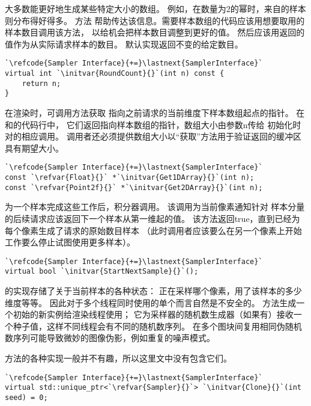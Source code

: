 大多数能更好地生成某些特定大小的数组。
例如，在数量为2的幂时，来自的样本则分布得好得多。
方法
帮助传达该信息。需要样本数组的代码应该用想要取用的样本数目调用该方法，
以给机会把样本数目调整到更好的值。
然后应该用返回的值作为从实际请求样本的数目。
默认实现返回不变的给定数目。
\begin{lstlisting}
`\refcode{Sampler Interface}{+=}\lastnext{SamplerInterface}`
virtual int `\initvar{RoundCount}{}`(int n) const {
    return n;
}
\end{lstlisting}

在渲染时，可调用方法获取
指向之前请求的当前维度下样本数组起点的指针。
在和的代码行中，
它们返回指向样本数组的指针，数组大小由参数{\ttfamily n}传给
初始化时对的相应调用。
调用者还必须提供数组大小以“获取”方法用于验证返回的缓冲区具有期望大小。
\begin{lstlisting}
`\refcode{Sampler Interface}{+=}\lastnext{SamplerInterface}`  
const `\refvar{Float}{}` *`\initvar{Get1DArray}{}`(int n);
const `\refvar{Point2f}{}` *`\initvar{Get2DArray}{}`(int n);
\end{lstlisting}

为一个样本完成这些工作后，积分器调用。
该调用为当前像素通知针对
样本分量的后续请求应该返回下一个样本从第一维起的值。
该方法返回{\ttfamily true}，直到已经为每个像素生成了请求的原始数目样本
（此时调用者应该要么在另一个像素上开始工作要么停止试图使用更多样本）。
\begin{lstlisting}
`\refcode{Sampler Interface}{+=}\lastnext{SamplerInterface}`
virtual bool `\initvar{StartNextSample}{}`();
\end{lstlisting}

的实现存储了关于当前样本的各种状态：
正在采样哪个像素，用了该样本的多少维度等等。
因此对于多个线程同时使用的单个而言自然是不安全的。
方法生成一个初始的新实例给渲染线程使用；
它为采样器的随机数生成器（如果有）接收一个种子值，这样不同线程会有不同的随机数序列。
在多个图块间复用相同伪随机数序列可能导致微妙的图像伪影，例如重复的噪声模式。

方法的各种实现一般并不有趣，所以这里文中没有包含它们。
\begin{lstlisting}
`\refcode{Sampler Interface}{+=}\lastnext{SamplerInterface}`
virtual std::unique_ptr<`\refvar{Sampler}{}`> `\initvar{Clone}{}`(int seed) = 0;
\end{lstlisting}

